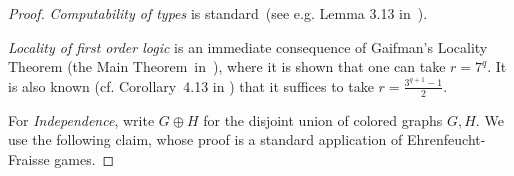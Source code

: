 \begin{proof}%

\emph{Computability of types} is standard~(see e.g. Lemma 3.13 in~\cite{libkin}).

\emph{Locality of first order logic} is an
immediate consequence of Gaifman's Locality Theorem
(the Main Theorem~in~\cite{gaifman1982local}),
where it is shown that one can take $r=7^q$.
It is also known (cf. Corollary~4.13 in \cite{libkin}) that it suffices to take $r=\frac{3^{q+1}-1}2$.


%

For \emph{Independence}, write $G\oplus H$ for the disjoint union of colored graphs $G,H$. 
We use the following claim, whose proof is a standard application of Ehrenfeucht-Fraisse games.



\end{proof}
